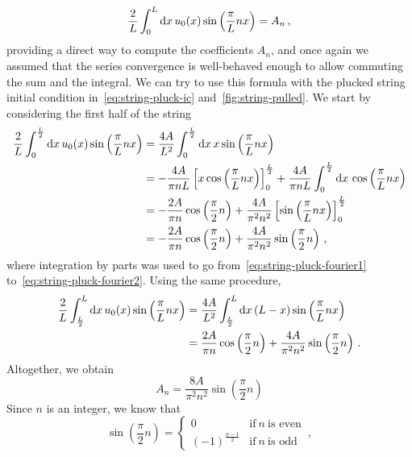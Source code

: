 \begin{equation}
  \frac{2}{L}\int_{0}^{L}\mathrm{d} x\, u_0(x)\sin\left(\frac{\pi}{L}nx\right)=A_n\,,
\end{equation}
providing a direct way to compute the coefficients $A_n$, and once again we assumed that
the series convergence is well-behaved enough to allow commuting the sum and the integral.
We can try to use this formula with the plucked string initial condition
in~\cref{eq:string-pluck-ic} and~\cref{fig:string-pulled}. We start by considering the
first half of the string
\begin{align}
  \frac{2}{L}\int_{0}^{\frac{L}{2}}\mathrm{d} x\, u_0(x)\sin\left(\frac{\pi}{L}nx\right)&
  =\frac{4A}{L^2}\int_{0}^{\frac{L}{2}}\mathrm{d} x\, x\sin\left(\frac{\pi}{L}nx\right)\\
  \label{eq:string-pluck-fourier1}
  &=-\frac{4A}{\pi n L}\left[x\cos\left(\frac{\pi}{L}nx\right)\right]_0^{\frac{L}{2}}
  +\frac{4A}{\pi n L}\int_{0}^{\frac{L}{2}}\mathrm{d} x\,\cos\left(\frac{\pi}{L}nx\right)\\
  \label{eq:string-pluck-fourier2}
  &=-\frac{2A}{\pi n}\cos\left(\frac{\pi}{2}n\right)+\frac{4A}{\pi^2 n^2}
  \left[\sin\left(\frac{\pi}{L}nx\right)\right]_0^{\frac{L}{2}}\\
  &=-\frac{2A}{\pi n}\cos\left(\frac{\pi}{2}n\right)+\frac{4A}{\pi^2 n^2}
  \sin\left(\frac{\pi}{2}n\right)\,,
\end{align}
where integration by parts was used to go from~\cref{eq:string-pluck-fourier1}
to~\cref{eq:string-pluck-fourier2}. Using the same procedure,
\begin{align}
  \frac{2}{L}\int_{\frac{L}{2}}^{L}\mathrm{d} x\, u_0(x)\sin\left(\frac{\pi}{L}nx\right)
  &=\frac{4A}{L^2}\int_{\frac{L}{2}}^{L}\mathrm{d} x\, (L-x)\sin\left(\frac{\pi}{L}nx\right)\\
  &=\frac{2A}{\pi n}\cos\left(\frac{\pi}{2}n\right)+\frac{4A}{\pi^2 n^2}
  \sin\left(\frac{\pi}{2}n\right)\,.
\end{align}
Altogether, we obtain
\begin{equation}
  A_n=\frac{8A}{\pi^2 n^2}\sin\left(\frac{\pi}{2}n\right)
\end{equation}
Since $n$ is an integer, we know that
\begin{equation}
  \sin\left(\frac{\pi}{2}n\right)=
  \begin{cases}
    0&\text{if}~n~\text{is even}\\
    (-1)^{\frac{n-1}{2}}&\text{if}~n~\text{is odd}
  \end{cases}\,,\label{eq:sinpn2}
\end{equation}
